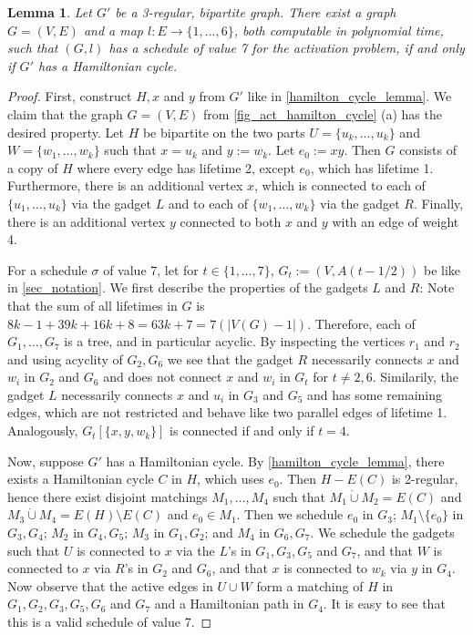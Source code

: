 \documentclass[10pt,a4paper]{article}
\newtheorem{lemma}[theorem]{Lemma}
\numberwithin{equation}{section}
\newcommand{\set}[1]{\{ #1 \}}
\newcommand{\fromto}[2]{\set{#1, \ldots, #2}}
\newcommand{\dotunion}{\mathbin{\dot{\cup}}}
\begin{document}
\begin{lemma}
Let $G'$ be a 3-regular, bipartite graph. There exist a graph $G = (V,E)$ and a map $l: E \rightarrow \fromto{1}{6}$, both computable in polynomial time, such that $(G, l)$ has a schedule of value 7 for the activation problem, if and only if $G'$ has a Hamiltonian cycle. 
\end{lemma}
\begin{proof}
First, construct $H, x$ and $y$ from $G'$ like in \cref{hamilton_cycle_lemma}.  We claim that the graph $G = (V, E)$ from \cref{fig_act_hamilton_cycle} (a) has the desired property. Let $H$ be bipartite on the two parts $U = \fromto{u_k}{u_k}$ and $W = \fromto{w_1}{w_k}$ such that $x = u_k$ and $y := w_k$. Let $e_0 := xy$. Then $G$ consists of a copy of $H$ where every edge has lifetime 2, except $e_0$, which has lifetime 1. Furthermore, there is an additional vertex $x$, which is connected to each of $\fromto{u_1}{u_k}$ via the gadget $L$ and to each of $\fromto{w_1}{w_k}$ via the gadget $R$. Finally, there is an additional vertex $y$ connected to both $x$ and $y$ with an edge of weight 4.

For a schedule $\sigma$ of value 7, let for $t \in \fromto{1}{7}$, $G_t := (V, A(t-1/2))$ be like in \cref{sec_notation}. We first describe the properties of the gadgets $L$ and $R$: Note that the sum of all lifetimes in $G$ is $8k - 1 + 39k + 16k + 8 = 63k + 7 = 7(|V(G) - 1|)$. Therefore, each of $G_{1}, \ldots, G_{7}$ is a tree, and in particular acyclic. By inspecting the vertices $r_1$ and $r_2$ and using acyclity of $G_2, G_6$ we see that the gadget $R$ necessarily connects $x$ and $w_i$ in $G_2$ and $G_6$ and does not connect $x$ and $w_i$ in $G_t$ for $t \neq 2,6$. Similarily, the gadget $L$ necessarily connects $x$ and $u_i$ in $G_3$ and $G_5$ and has some remaining edges, which are not restricted and behave like two parallel edges of lifetime 1. Analogously, $G_{t}[\set{x, y, w_k}]$ is connected if and only if $t = 4$.

Now, suppose $G'$ has a Hamiltonian cycle. By \cref{hamilton_cycle_lemma}, there exists a Hamiltonian cycle $C$ in $H$, which uses $e_0$. Then $H - E(C)$ is 2-regular, hence there exist disjoint matchings $M_1, \ldots, M_4$ such that $M_1 \dotunion M_2 = E(C)$ and $M_3 \dotunion M_4 = E(H) \setminus E(C)$ and $e_0 \in M_1$. Then we schedule $e_0$ in $G_3$; $M_1 \setminus \set{e_0}$ in $G_3, G_4$; $M_2$ in $G_4, G_5$; $M_3$ in $G_1, G_2$; and $M_4$ in $G_6, G_7$. We schedule the gadgets such that $U$ is connected to $x$ via the $L$'s in $G_1, G_3, G_5$ and $ G_7$, and that $W$ is connected to $x$ via $R$'s in $G_2$ and $G_6$, and that $x$ is connected to $w_k$ via $y$ in $G_4$. Now observe that the active edges in $U \cup W$ form a matching of $H$ in $G_1, G_2, G_3, G_5, G_6$ and $G_7$ and a Hamiltonian path in $G_4$. It is easy to see that this is a valid schedule of value 7. 


\end{proof}
\end{document}
